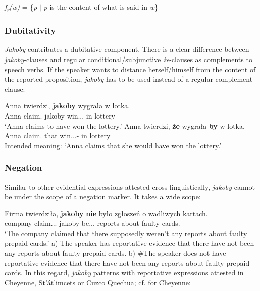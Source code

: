 \documentclass[output=paper
,modfonts
,nonflat]{langsci/langscibook}
\begin{document}
\ea  \emph{f\textsubscript{r}(w)} = \{\emph{p} $ \mid $ \emph{p} is the content of what is said in \emph{w}\} \z
 
 \subsubsection{Dubitativity}
 \emph{Jakoby} contributes a dubitative component. There is a clear difference between \emph{jakoby}-clauses and regular conditional\slash subjunctive \emph{że}-clauses as complements to speech verbs. If the speaker wants to distance herself\slash himself from the content of the reported proposition, \emph{jakoby} has to be used instead of a regular complement clause: 

\ea \ea \gll	Anna twierdzi, \textbf{jakoby} wygrała w lotka. \\
		Anna claim.{\thirdperson}{\sg} jakoby win.{\lptcp}.{\sg}.{\fem} in lottery \\
	\glt	`Anna claims to have won the lottery.'
	\ex\gll	*Anna twierdzi, \textbf{że} wygrała-\textbf{by} w lotka. \\  
            Anna claim.{\thirdperson}{\sg} that win.{\lptcp}.{\sg}.{\fem}-{\subj} in lottery \\
	\glt	Intended meaning: `Anna claims that she would have won the lottery.' 
\z\z		
\subsubsection{Negation} 
Similar to other evidential expressions attested cross-linguistically, \emph{jakoby} cannot be under the scope of a negation marker. It takes a wide scope: 

\ea \gll Firma twierdziła, \textbf{jakoby} \textbf{nie} było zgłoszeń o wadliwych kartach. \\
		company claim.{\lptcp}.{\sg}.{\fem} jakoby {\negation} be.{\lptcp}.{\sg}.{\n} reports about faulty cards.{\loc} \\
		`The company claimed that there supposedly weren't any reports about faulty prepaid cards.' \newline
\glt	a) The speaker has reportative evidence that there have not been any reports about faulty prepaid cards. 
\glt	b) \#The speaker does not have reportative evidence that there have not been any reports about faulty prepaid cards.
\z
In this regard, \emph{jakoby} patterns with reportative expressions attested in Cheyenne, St'át'imcets or Cuzco Quechua; cf.  for Cheyenne:
\end{document}
